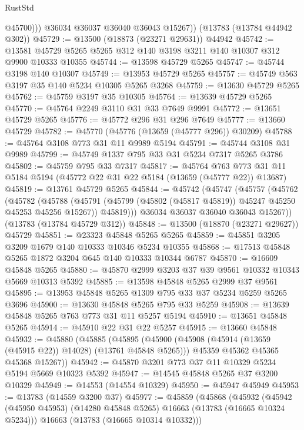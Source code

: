 \begin{lexlean}{RustStd}
\begin{coremodule}
              @45700)))
        @36034
        @36037
        @36040
        @36043
        @15267))
    (@13783 (@13784 @44942 @302))
@45729 := @13500 (@18873 (@23271 @29631)) @44942
@45742 := @13581 @45729 @5265 @5265 @312 @140 @3198 @3211 @140 @10307 @312 @9900 @10333 @10355
@45744 := @13598 @45729 @5265
@45747 := @45744 @3198 @140 @10307
@45749 := @13953 @45729 @5265
@45757 := @45749 @563 @3197 @35 @140 @5234 @10305 @5265 @3268
@45759 := @13630 @45729 @5265
@45762 := @45759 @3197 @35 @10305
@45764 := @13639 @45729 @5265
@45770 := @45764 @2249 @3110 @31 @33 @7649 @9991
@45772 := @13651 @45729 @5265
@45776 := @45772 @296 @31 @296 @7649
@45777 := @13660 @45729
@45782 := @45770 (@45776 (@13659 (@45777 @296)) @30209)
@45788 := @45764 @3108 @773 @31 @11 @9989 @5194
@45791 := @45744 @3108 @31 @9989
@45799 := @45749 @1337 @795 @33 @31 @5234 @7317 @5265 @3786
@45802 := @45759 @795 @33 @7317
@45817 := @45764
    @763
    @773
    @31
    @11
    @5184
    @5194
    (@45772 @22 @31 @22 @5184 (@13659 (@45777 @22)) @13687)
@45819 := @13761 @45729 @5265
@45844 := @45742
    (@45747
      (@45757
        (@45762
          (@45782
            (@45788
              (@45791 (@45799 (@45802 (@45817 @45819)) @45247 @45250 @45253 @45256 @15267))
              @45819)))
        @36034
        @36037
        @36040
        @36043
        @15267))
    (@13783 (@13784 @45729 @312))
@45848 := @13500 (@18870 (@23271 @29627)) @45729
@45851 := @23323 @45848 @5265 @5265
@45859 := @45851 @3205 @3209 @1679 @140 @10333 @10346 @5234 @10355
@45868 := @17513 @45848 @5265 @1872 @3204 @645 @140 @10333 @10344 @6787
@45870 := @16609 @45848 @5265
@45880 := @45870 @2999 @3203 @37 @39 @9561 @10332 @10343 @5669 @10313 @5392
@45885 := @13598 @45848 @5265 @2999 @37 @9561
@45895 := @13953 @45848 @5265 @1309 @795 @33 @37 @5234 @5259 @5265 @3696
@45900 := @13630 @45848 @5265 @795 @33 @5259
@45908 := @13639 @45848 @5265 @763 @773 @31 @11 @5257 @5194
@45910 := @13651 @45848 @5265
@45914 := @45910 @22 @31 @22 @5257
@45915 := @13660 @45848
@45932 := @45880
    (@45885
      (@45895
        (@45900 (@45908 (@45914 (@13659 (@45915 @22)) @14028) (@13761 @45848 @5265)))
        @45359
        @45362
        @45365
        @45368
        @15267))
@45942 := @45870 @3201 @773 @37 @11 @10329 @5234 @5194 @5669 @10323 @5392
@45947 := @14545 @45848 @5265 @37 @3200 @10329
@45949 := @14553 (@14554 @10329)
@45950 := @45947 @45949
@45953 := @13783 (@14559 @3200 @37)
@45977 := @45859
    (@45868
      (@45932
        (@45942 (@45950 @45953) (@14280 @45848 @5265) @16663 (@13783 (@16665 @10324 @5234)))
        @16663
        (@13783 (@16665 @10314 @10332)))

\end{coremodule}
\end{lexlean}
